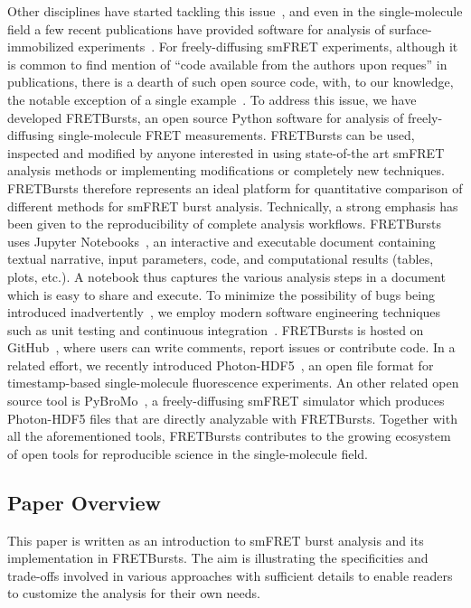 \documentclass[10pt,letterpaper]{article}
\begin{document}
Other disciplines have started tackling this issue~\cite{Eglen_2016},
and even in the single-molecule field a few recent publications have provided 
software for analysis of surface-immobilized experiments~\cite{McKinney_2006,Bronson_2009,Greenfeld_2012,K_nig_2013,van_de_Meent_2014}.
For freely-diffusing smFRET experiments, although it is common to find mention of 
``code available from the authors upon reques'' in publications, there is a dearth 
of such open source code, with, to our knowledge, the notable exception of a single 
example~\cite{Murphy2014}.
To address this issue, we have developed FRETBursts,
an open source Python software for analysis of freely-diffusing single-molecule FRET measurements.
FRETBursts can be used, inspected and modified by anyone interested in using 
state-of-the art smFRET analysis methods or implementing modifications or completely new techniques. 
FRETBursts therefore represents an ideal platform
for quantitative comparison of different methods for smFRET burst analysis.
Technically, a strong emphasis has been given to the reproducibility of complete analysis
workflows. FRETBursts uses Jupyter Notebooks~\cite{Shen_2014},
an interactive and executable document containing textual narrative, input parameters, 
code, and computational results (tables, plots, etc.). A notebook thus captures the various analysis steps
in a document which is easy to share and execute.
To minimize the possibility of bugs being introduced inadvertently~\cite{Soergel_2015}, 
we employ modern software engineering techniques
such as unit testing and continuous integration~\cite{Wilson_2014,Eglen_2016}.
FRETBursts is hosted on GitHub~\cite{Blischak_2016,Prli__2012},
where users can write comments, report issues or contribute code.
In a related effort, we recently introduced Photon-HDF5~\cite{Ingargiola2016},
an open file format for timestamp-based single-molecule fluorescence
experiments. An other related open source tool is PyBroMo~\cite{Ingargiola_2016},
a freely-diffusing smFRET simulator which produces Photon-HDF5 files that are
directly analyzable with FRETBursts.
Together with all the aforementioned tools, FRETBursts contributes to the growing 
ecosystem of open tools for reproducible science in the single-molecule field.

\subsection{Paper Overview}
This paper is written as an introduction to smFRET burst analysis and 
its implementation in FRETBursts.
The aim is illustrating the specificities and 
trade-offs involved in various approaches
with sufficient details to enable readers 
to customize the analysis for their own needs.
\end{document}
